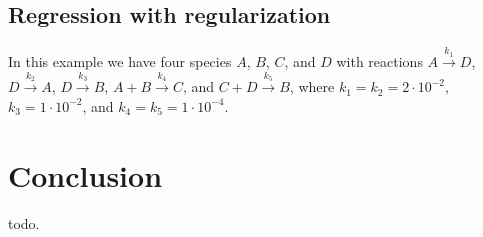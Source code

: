 \documentclass[oneside, abstracton, titlepage]{scrartcl}
\begin{document}
	\subsection{Regression with regularization}
	In this example we have four species $A$, $B$, $C$, and $D$ with reactions $A\xrightarrow{k_1}D$, $D\xrightarrow{k_2}A$, $D\xrightarrow{k_3}B$, $A+B\xrightarrow{k_4}C$, and $C+D\xrightarrow{k_5}B$, where $k_1=k_2=2\cdot 10^{-2}$, $k_3 = 1\cdot 10^{-2}$, and $k_4=k_5=1\cdot 10^{-4}$. 
	
	
	\section{Conclusion}
	todo.
	
	
	\newpage
% 	
	
	
	
\end{document}
